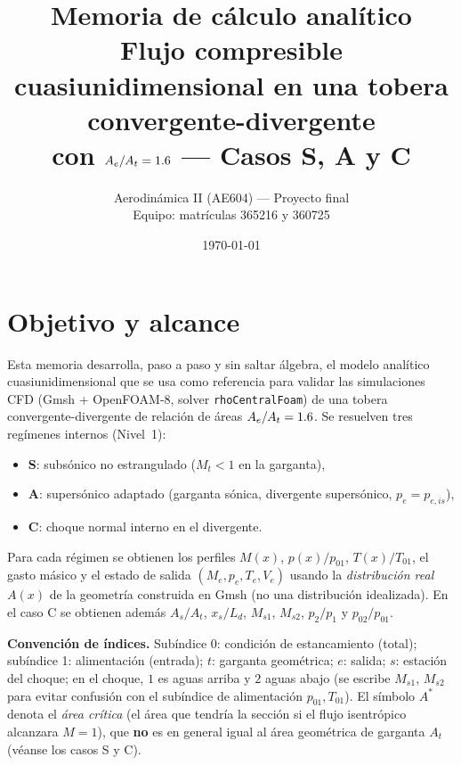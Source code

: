 \documentclass[11pt,a4paper]{article}
\title{\textbf{Memoria de cálculo analítico}\\[2pt]
       \large Flujo compresible cuasiunidimensional en una tobera convergente-divergente\\
       con $A_e/A_t = 1.6$ --- Casos S, A y C}
\author{Aerodinámica II (AE604) --- Proyecto final\\ Equipo: matrículas 365216 y 360725}
\date{\today}
\begin{document}
\maketitle
\tableofcontents
\newpage

\section{Objetivo y alcance}
Esta memoria desarrolla, paso a paso y sin saltar álgebra, el modelo analítico
cuasiunidimensional que se usa como referencia para validar las simulaciones CFD
(Gmsh + OpenFOAM-8, solver \texttt{rhoCentralFoam}) de una tobera convergente-divergente
de relación de áreas $A_e/A_t=1.6$. Se resuelven tres regímenes internos (Nivel~1):

\begin{itemize}[leftmargin=2em]
\item \textbf{S}: subsónico no estrangulado ($M_t<1$ en la garganta),
\item \textbf{A}: supersónico adaptado (garganta sónica, divergente supersónico, $p_e=p_{e,is}$),
\item \textbf{C}: choque normal interno en el divergente.
\end{itemize}

Para cada régimen se obtienen los perfiles $M(x)$, $p(x)/p_{01}$, $T(x)/T_{01}$, el gasto
másico y el estado de salida $(M_e,p_e,T_e,V_e)$ usando la \emph{distribución real} $A(x)$ de la
geometría construida en Gmsh (no una distribución idealizada). En el caso C se obtienen además
$A_s/A_t$, $x_s/L_d$, $M_{s1}$, $M_{s2}$, $p_2/p_1$ y $p_{02}/p_{01}$.

\textbf{Convención de índices.} Subíndice 0: condición de estancamiento (total); subíndice 1:
alimentación (entrada); $t$: garganta geométrica; $e$: salida; $s$: estación del choque; en el choque,
$1$ es aguas arriba y $2$ aguas abajo (se escribe $M_{s1}$, $M_{s2}$ para evitar confusión con el
subíndice de alimentación $p_{01},T_{01}$). El símbolo $A^{*}$ denota el \emph{área crítica}
(el área que tendría la sección si el flujo isentrópico alcanzara $M=1$), que \textbf{no} es
en general igual al área geométrica de garganta $A_t$ (véanse los casos S y C).

\end{document}
